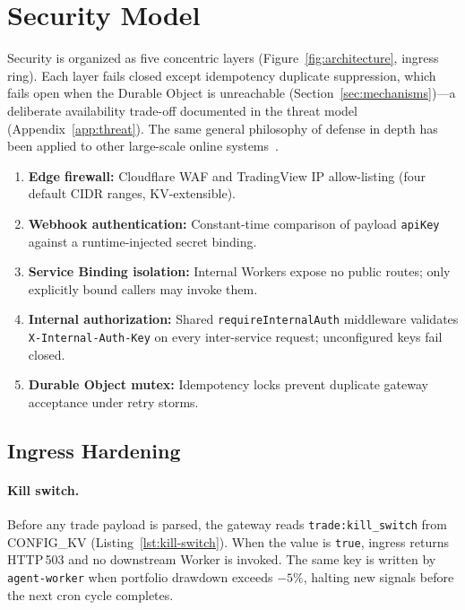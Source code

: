 \section{Security Model}
\label{sec:security}

Security is organized as five concentric layers (Figure~\ref{fig:architecture}, ingress ring). Each layer fails closed except idempotency duplicate suppression, which fails open when the Durable Object is unreachable (Section~\ref{sec:mechanisms})---a deliberate availability trade-off documented in the threat model (Appendix~\ref{app:threat}). The same general philosophy of defense in depth has been applied to other large-scale online systems~\cite{decandia2007dynamo,nist2020zerotrust}.

\begin{enumerate}
  \item \textbf{Edge firewall:} Cloudflare WAF and TradingView IP allow-listing (four default CIDR ranges, KV-extensible).
  \item \textbf{Webhook authentication:} Constant-time comparison of payload \texttt{apiKey} against a runtime-injected secret binding.
  \item \textbf{Service Binding isolation:} Internal Workers expose no public routes; only explicitly bound callers may invoke them.
  \item \textbf{Internal authorization:} Shared \texttt{requireInternalAuth} middleware validates \texttt{X-Internal-Auth-Key} on every inter-service request; unconfigured keys fail closed.
  \item \textbf{Durable Object mutex:} Idempotency locks prevent duplicate gateway acceptance under retry storms.
\end{enumerate}

\subsection{Ingress Hardening}

\paragraph{Kill switch.} Before any trade payload is parsed, the gateway reads \texttt{trade:kill\_switch} from CONFIG\_KV (Listing~\ref{lst:kill-switch}). When the value is \texttt{true}, ingress returns HTTP\,503 and no downstream Worker is invoked. The same key is written by \texttt{agent-worker} when portfolio drawdown exceeds $-5\%$, halting new signals before the next cron cycle completes.


